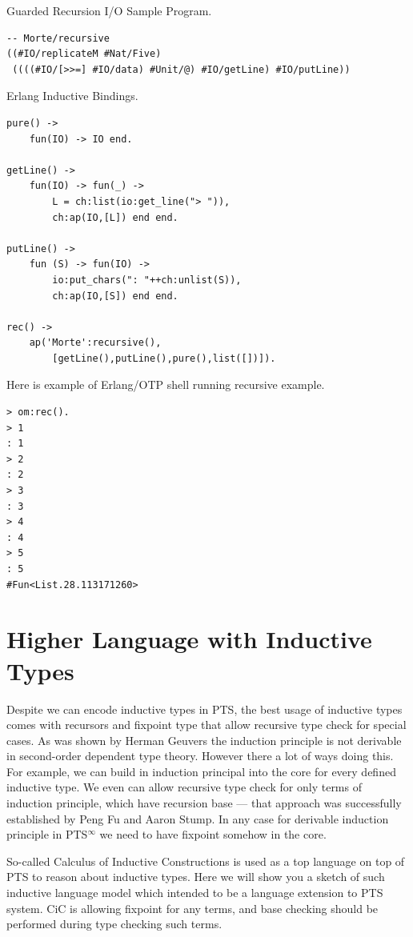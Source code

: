 \documentclass{aip-cp}
\begin{document}
Guarded Recursion I/O Sample Program.

\begin{lstlisting}[mathescape=true]
-- Morte/recursive
((#IO/replicateM #Nat/Five)
 ((((#IO/[>>=] #IO/data) #Unit/@) #IO/getLine) #IO/putLine))
\end{lstlisting}

Erlang Inductive Bindings.

\begin{lstlisting}[mathescape=true]
pure() ->
    fun(IO) -> IO end.

getLine() ->
    fun(IO) -> fun(_) ->
        L = ch:list(io:get_line("> ")),
        ch:ap(IO,[L]) end end.

putLine() ->
    fun (S) -> fun(IO) ->
        io:put_chars(": "++ch:unlist(S)),
        ch:ap(IO,[S]) end end.

rec() ->
    ap('Morte':recursive(),
        [getLine(),putLine(),pure(),list([])]).
\end{lstlisting}


Here is example of Erlang/OTP shell running recursive example.

\begin{lstlisting}[mathescape=true]
> om:rec().
> 1
: 1
> 2
: 2
> 3
: 3
> 4
: 4
> 5
: 5
#Fun<List.28.113171260>
\end{lstlisting}

\section{Higher Language with Inductive Types}
Despite we can encode inductive types in PTS, the best usage of inductive types
comes with recursors and fixpoint type that allow recursive type check for special cases.
As was shown by Herman Geuvers\cite{Geuvers01} the induction principle is not derivable in second-order
dependent type theory. However there a lot of ways doing this. For example, we can
build in induction principal into the core for every defined inductive type. We even
can allow recursive type check for only terms of induction principle, which have recursion base ---
that approach was successfully established by Peng Fu and Aaron Stump\cite{Stump17}.
In any case for derivable induction principle in PTS$^\infty$ we need to have fixpoint
somehow in the core.

So-called Calculus of Inductive Constructions\cite{Mohring15} is used as a top language on top of
PTS to reason about inductive types. Here we will show you a sketch of such
inductive language model which intended to be a language extension to PTS system.
CiC is allowing fixpoint for any terms, and base checking should be performed
during type checking such terms.
\end{document}
